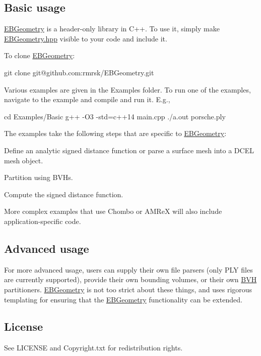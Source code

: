 \subsection*{Basic usage }

\hyperlink{namespaceEBGeometry}{E\+B\+Geometry} is a header-\/only library in C++. To use it, simply make \hyperlink{EBGeometry_8hpp_source}{E\+B\+Geometry.\+hpp} visible to your code and include it.

To clone \hyperlink{namespaceEBGeometry}{E\+B\+Geometry}\+: \begin{DoxyVerb}git clone git@github.com:rmrsk/EBGeometry.git
\end{DoxyVerb}


Various examples are given in the Examples folder. To run one of the examples, navigate to the example and compile and run it. E.\+g., \begin{DoxyVerb}cd Examples/Basic
g++ -O3 -std=c++14 main.cpp
./a.out porsche.ply
\end{DoxyVerb}


The examples take the following steps that are specific to \hyperlink{namespaceEBGeometry}{E\+B\+Geometry}\+:


\begin{DoxyEnumerate}
\item Define an analytic signed distance function or parse a surface mesh into a D\+C\+EL mesh object.
\item Partition using B\+V\+Hs.
\item Compute the signed distance function.
\end{DoxyEnumerate}

More complex examples that use Chombo or A\+M\+ReX will also include application-\/specific code.

\subsection*{Advanced usage }

For more advanced usage, users can supply their own file parsers (only P\+LY files are currently supported), provide their own bounding volumes, or their own \hyperlink{namespaceBVH}{B\+VH} partitioners. \hyperlink{namespaceEBGeometry}{E\+B\+Geometry} is not too strict about these things, and uses rigorous templating for ensuring that the \hyperlink{namespaceEBGeometry}{E\+B\+Geometry} functionality can be extended.

\subsection*{License }

See L\+I\+C\+E\+N\+SE and Copyright.\+txt for redistribution rights. 
